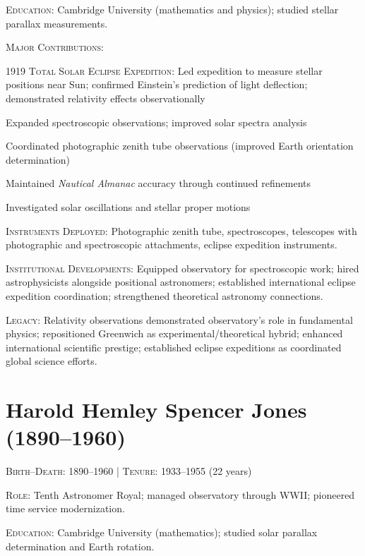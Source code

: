 \noindent\textsc{Education}: Cambridge University (mathematics and physics); studied stellar parallax measurements.

\noindent\textsc{Major Contributions}:
\begin{enumerate*}[label=(\arabic*)]
\item \textsc{1919 Total Solar Eclipse Expedition}: Led expedition to measure stellar positions near Sun; confirmed Einstein's prediction of light deflection; demonstrated relativity effects observationally
\item Expanded spectroscopic observations; improved solar spectra analysis
\item Coordinated photographic zenith tube observations (improved Earth orientation determination)
\item Maintained \emph{Nautical Almanac} accuracy through continued refinements
\item Investigated solar oscillations and stellar proper motions
\end{enumerate*}

\noindent\textsc{Instruments Deployed}: Photographic zenith tube, spectroscopes, telescopes with photographic and spectroscopic attachments, eclipse expedition instruments.

\noindent\textsc{Institutional Developments}: Equipped observatory for spectroscopic work; hired astrophysicists alongside positional astronomers; established international eclipse expedition coordination; strengthened theoretical astronomy connections.

\noindent\textsc{Legacy}: Relativity observations demonstrated observatory's role in fundamental physics; repositioned Greenwich as experimental/theoretical hybrid; enhanced international scientific prestige; established eclipse expeditions as coordinated global science efforts.

\medskip

\section*{Harold Hemley Spencer Jones (1890--1960)}
\textsc{Birth--Death}: 1890--1960 | \textsc{Tenure}: 1933--1955 (22 years)

\noindent\textsc{Role}: Tenth Astronomer Royal; managed observatory through WWII; pioneered time service modernization.

\noindent\textsc{Education}: Cambridge University (mathematics); studied solar parallax determination and Earth rotation.

